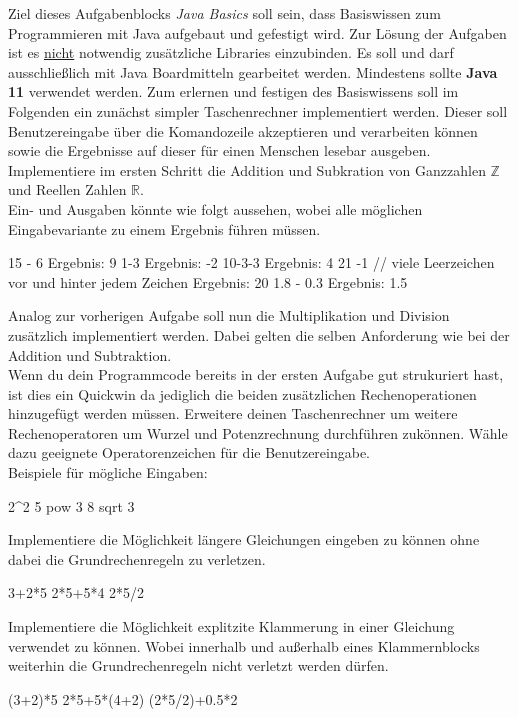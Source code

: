 


Ziel dieses Aufgabenblocks \textsl{Java Basics} soll sein, dass Basiswissen zum Programmieren mit Java aufgebaut und gefestigt wird. Zur Lösung der Aufgaben ist es \underline{nicht} notwendig zusätzliche Libraries einzubinden. Es soll und darf ausschließlich mit Java Boardmitteln gearbeitet werden. Mindestens sollte \textbf{Java 11} verwendet werden.
Zum erlernen und festigen des Basiswissens soll im Folgenden ein zunächst simpler Taschenrechner implementiert werden. Dieser soll Benutzereingabe über die Komandozeile akzeptieren und verarbeiten können sowie die Ergebnisse auf dieser für einen Menschen lesebar ausgeben.
Implementiere im ersten Schritt die Addition und Subkration von Ganzzahlen $\mathbb{Z}$ und Reellen Zahlen $\mathbb{R}$.\\
Ein- und Ausgaben könnte wie folgt aussehen, wobei alle möglichen Eingabevariante zu einem Ergebnis führen müssen.
\begin{codeblock}
15 - 6
Ergebnis: 9
1-3
Ergebnis: -2
10-3-3
Ergebnis: 4
21            -1      // viele Leerzeichen vor und hinter jedem Zeichen
Ergebnis: 20
1.8 - 0.3
Ergebnis: 1.5
\end{codeblock}
Analog zur vorherigen Aufgabe soll nun die Multiplikation und Division zusätzlich implementiert werden. Dabei gelten die selben Anforderung wie bei der Addition und Subtraktion.\\
Wenn du dein Programmcode bereits in der ersten Aufgabe gut strukuriert hast, ist dies ein Quickwin da jediglich die beiden zusätzlichen Rechenoperationen hinzugefügt werden müssen.
Erweitere deinen Taschenrechner um weitere Rechenoperatoren um Wurzel und Potenzrechnung durchführen zukönnen. Wähle dazu geeignete Operatorenzeichen für die Benutzereingabe.\\
Beispiele für mögliche Eingaben:
\begin{codeblock}
2^2
5 pow 3
8 sqrt 3
\end{codeblock}
Implementiere die Möglichkeit längere Gleichungen eingeben zu können ohne dabei die Grundrechenregeln zu verletzen.
\begin{codeblock}
3+2*5
2*5+5*4
2*5/2
\end{codeblock}
Implementiere die Möglichkeit explitzite Klammerung in einer Gleichung verwendet zu können. Wobei innerhalb und außerhalb eines Klammernblocks weiterhin die Grundrechenregeln nicht verletzt werden dürfen.
\begin{codeblock}
(3+2)*5
2*5+5*(4+2)
(2*5/2)+0.5*2
\end{codeblock}


